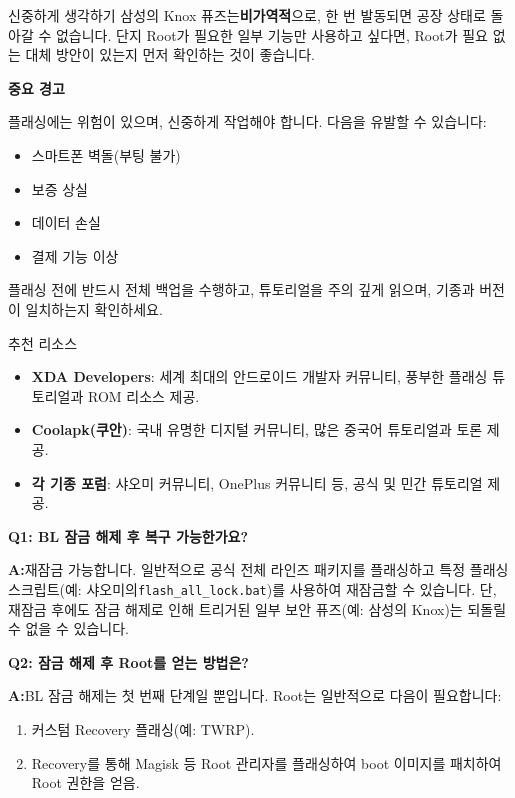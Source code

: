 \begin{tcbwarn}{신중하게 생각하기}
삼성의 Knox 퓨즈는\textbf{비가역적}으로, 한 번 발동되면 공장 상태로 돌아갈 수 없습니다. 단지 Root가 필요한 일부 기능만 사용하고 싶다면, Root가 필요 없는 대체 방안이 있는지 먼저 확인하는 것이 좋습니다.

\end{tcbwarn}

\textbf{중요 경고}\par

플래싱에는 위험이 있으며, 신중하게 작업해야 합니다. 다음을 유발할 수 있습니다:

\begin{itemize}
  \item 스마트폰 벽돌(부팅 불가)
  \item 보증 상실
  \item 데이터 손실
  \item 결제 기능 이상
\end{itemize}

플래싱 전에 반드시 전체 백업을 수행하고, 튜토리얼을 주의 깊게 읽으며, 기종과 버전이 일치하는지 확인하세요.

\begin{tcbinfo}{추천 리소스}
\begin{itemize}
  \item \textbf{XDA Developers}: 세계 최대의 안드로이드 개발자 커뮤니티, 풍부한 플래싱 튜토리얼과 ROM 리소스 제공.
  \item \textbf{Coolapk(쿠안)}: 국내 유명한 디지털 커뮤니티, 많은 중국어 튜토리얼과 토론 제공.
  \item \textbf{각 기종 포럼}: 샤오미 커뮤니티, OnePlus 커뮤니티 등, 공식 및 민간 튜토리얼 제공.
\end{itemize}

\end{tcbinfo}


\textbf{Q1: BL 잠금 해제 후 복구 가능한가요?}\par

\textbf{A:}재잠금 가능합니다. 일반적으로 공식 전체 라인즈 패키지를 플래싱하고 특정 플래싱 스크립트(예: 샤오미의\texttt{flash\_all\_lock.\allowbreak bat})를 사용하여 재잠금할 수 있습니다. 단, 재잠금 후에도 잠금 해제로 인해 트리거된 일부 보안 퓨즈(예: 삼성의 Knox)는 되돌릴 수 없을 수 있습니다.

\textbf{Q2: 잠금 해제 후 Root를 얻는 방법은?}\par

\textbf{A:}BL 잠금 해제는 첫 번째 단계일 뿐입니다. Root는 일반적으로 다음이 필요합니다:

\begin{enumerate}
  \item 커스텀 Recovery 플래싱(예: TWRP).
  \item Recovery를 통해 Magisk 등 Root 관리자를 플래싱하여 boot 이미지를 패치하여 Root 권한을 얻음.
\end{enumerate}
